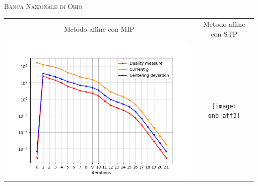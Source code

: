 \begin{frame}{\textsc{\LARGE \textcolor{iris}{Banca Nazionale di Ohio}}}
	\centering
	\begin{tabular}{c@{}c}
		\small{Metodo affine con MIP} & \small{Metodo affine con STP} \\
		\includegraphics[scale = 0.33]{onb_aff1}
		&\texttt{[image: onb\_aff3]}\\ 
	\end{tabular}
\end{frame}

